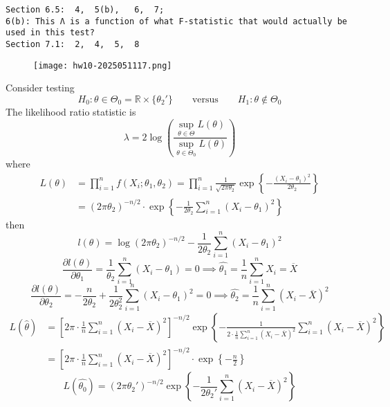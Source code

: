 \begin{lstlisting}
Section 6.5:  4,  5(b),   6,  7;   
6(b): This Λ is a function of what F-statistic that would actually be used in this test?  
Section 7.1:  2,  4,  5,  8
\end{lstlisting}
\begin{exercise}
\begin{figure}[H]
\centering
\texttt{[image: hw10-2025051117.png]}
\label{}
\end{figure}
\end{exercise}
Consider testing
\[
H_0:\theta\in\Theta_0=\mathbb{R}\times\{ \theta_2' \}\qquad \text{versus}\qquad H_1:\theta \not\in\Theta_0
\]
The likelihood ratio statistic is
\[
\lambda=2\log \left( \frac{\sup_{\theta\in\Theta}L(\theta)}{\sup_{\theta\in\Theta_0}L(\theta)} \right)
\]
where
\[
\begin{aligned}
L(\theta) & =\prod_{i=1}^{n} f(X_i;\theta_1,\theta_2)=\prod_{i=1}^{n} \frac{1}{\sqrt{ 2\pi\theta_2 }}\exp \left\{  -\frac{(X_i-\theta_1)^2}{2\theta_2}  \right\} \\
 & =(2\pi\theta_2)^{-n/2 }\cdot \exp \left\{  -\frac{1}{2\theta_2}\sum_{i=1}^{n} (X_i-\theta_1)^2  \right\}
\end{aligned}
\]
then
\[
l(\theta)=\log(2\pi\theta_2)^{-n/2 }-\frac{1}{2\theta_2}\sum_{i=1}^{n} (X_i-\theta_1)^2
\]
\[
\frac{ \partial l(\theta) }{ \partial \theta_1 } =\frac{1}{\theta_2}\sum_{i=1}^{n} (X_i-\theta_1)=0\implies  \widehat{\theta_1}=\frac{1}{n}\sum_{i=1}^{n} X_i=\overline{X}
\]
\[
\frac{ \partial l(\theta) }{ \partial \theta_2 } =-\frac{n}{2\theta_2}+\frac{1}{2\theta_2^2}\sum_{i=1}^{n} (X_i-\theta_1)^2=0\implies  \widehat{\theta_2}=\frac{1}{n}\sum_{i=1}^{n} (X_i-\overline{X})^2
\]
\[
\begin{aligned}
L(\widehat{\theta}) & =\left[ 2\pi \cdot\frac{1}{n}\sum_{i=1}^{n}(X_i-\overline{X})^2  \right]^{-n/2 }\exp \left\{  -\frac{1}{2\cdot\frac{1}{n}\sum_{i=1}^{n} (X_i-\overline{X})^2}\sum_{i=1}^{n} (X_i-\overline{X})^2  \right\} \\
 & =\left[ 2\pi \cdot\frac{1}{n}\sum_{i=1}^{n}(X_i-\overline{X})^2  \right]^{-n/2 }\cdot \exp \left\{  -\frac{n}{2}  \right\} 
\end{aligned}
\]
\[
L(\widehat{\theta_0})=(2\pi\theta_2')^{-n/2 }\exp \left\{  -\frac{1}{2\theta_2'} \sum_{i=1}^{n}(X_i-\overline{X})^2  \right\}
\]
